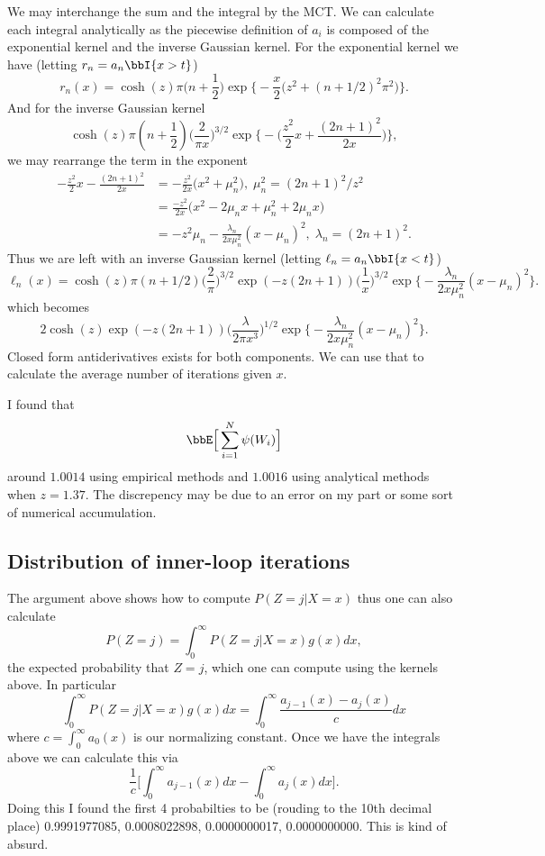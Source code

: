 \documentclass{article}
\begin{document}
We may interchange the sum and the integral by the MCT.  We can calculate each
integral analytically as the piecewise definition of $a_i$ is composed of the
exponential kernel and the inverse Gaussian kernel.  For the exponential kernel
we have (letting $r_n = a_n \bbI \{x > t\}$)
\[
r_n(x) = \cosh(z) \pi \Big(n + \frac{1}{2}\Big) 
\exp \Big\{ -\frac{x}{2} \Big( z^2 + (n+1/2)^2 \pi^2 \Big) \Big\}.
\]
And for the inverse Gaussian kernel
\[
\cosh(z)
\pi (n+\frac{1}{2}) \Big(\frac{2}{\pi x}\Big)^{3/2}
  \exp \Big\{ - \Big( \frac{z^2}{2} x + \frac{(2n+1)^2}{2x} \Big) \Big\},
\]
we may rearrange the term in the exponent
\begin{align*}
- \frac{z^2}{2}x - \frac{(2n + 1)^2}{2x}
& = -\frac{z^2}{2x} \Big( x^2 + \mu_n^2 \Big), \; \mu_n^2 = (2n+1)^2 / z^2
\\
& = \frac{-z^2}{2x} \Big( x^2 - 2 \mu_n x + \mu_n^2 + 2 \mu_n x \Big) \\
& = -z^2 \mu_n - \frac{\lambda_n}{2x \mu_n^2} (x - \mu_n)^2, \; \lambda_n =
(2n+1)^2.
\end{align*}
Thus we are left with an inverse Gaussian kernel (letting $\ell_n = a_n \bbI \{x
< t\}$)
\[
\ell_n(x) = 
\cosh(z) \pi (n + 1/2) \Big(\frac{2}{\pi}\Big)^{3/2} \exp(-z (2n+1))
\Big(\frac{1}{x}\Big)^{3/2}
\exp \Big\{ -\frac{\lambda_n}{2x\mu_n^2}(x-\mu_n)^2 \Big\}.
\]
which becomes
\[
2 \cosh(z) \exp(-z(2n+1))
\Big(\frac{\lambda}{2 \pi x^3}\Big)^{1/2} 
\exp \Big\{ -\frac{\lambda_n}{2x\mu_n^2}(x-\mu_n)^2 \Big\}.
\]
Closed form antiderivatives exists for both components.  We can use that to
calculate the average number of iterations given $x$.

I found that 
\[
\bbE \Big[\sum_{i=1}^N \psi(W_i) \Big]
\]
around $1.0014$ using empirical methods and $1.0016$ using analytical methods
when $z = 1.37$.  The discrepency may be due to an error on my part or some sort
of numerical accumulation.

\subsection{Distribution of inner-loop iterations}

The argument above shows how to compute $P(Z = j | X = x)$ thus one can also
calculate
\[
P(Z = j) = \int_{0}^\infty P(Z = j | X = x) g(x) dx,
\]
the expected probability that $Z = j$, which one can compute using the kernels
above.  In particular
\[
\int_{0}^\infty P(Z = j | X = x) g(x) dx = \int_0^\infty \frac{a_{j-1}(x) -
  a_j(x)}{c} dx
\]
where $c = \int_0^\infty a_0(x)$ is our normalizing constant.  Once we have the
integrals above we can calculate this via
\[
\frac{1}{c} \Big[ \int_0^\infty a_{j-1}(x) dx - \int_0^\infty  a_j(x) dx \Big].
\]
Doing this I found the first 4 probabilties to be (rouding to the 10th decimal
place) 0.9991977085, 0.0008022898, 0.0000000017, 0.0000000000.  This is kind
of absurd.
\end{document}
